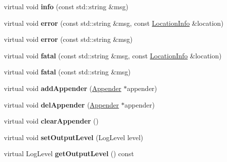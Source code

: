 \begin{DoxyCompactItemize}
\item 
\mbox{\label{classLogger_a681330b09bac2b5dd40a8c8e7f1ce622}} 
virtual void {\bfseries info} (const std\+::string \&msg)
\item 
\mbox{\label{classLogger_aa0a6eb4e205acfc74aaaddd95807fa79}} 
virtual void {\bfseries error} (const std\+::string \&msg, const \hyperlink{classLocationInfo}{Location\+Info} \&location)
\item 
\mbox{\label{classLogger_aa369ce9c9e7452f84027d7644944ecf7}} 
virtual void {\bfseries error} (const std\+::string \&msg)
\item 
\mbox{\label{classLogger_a5ec862064755ee33ff865e47a587959c}} 
virtual void {\bfseries fatal} (const std\+::string \&msg, const \hyperlink{classLocationInfo}{Location\+Info} \&location)
\item 
\mbox{\label{classLogger_a7ad5aa4c133caa1eb1f9083ac99c0dc7}} 
virtual void {\bfseries fatal} (const std\+::string \&msg)
\item 
\mbox{\label{classLogger_a088c8d721517bc477072877adab07b87}} 
virtual void {\bfseries add\+Appender} (\hyperlink{classAppender}{Appender} $\ast$appender)
\item 
\mbox{\label{classLogger_a73285190e257bb20ea4a0d13ecc854a5}} 
virtual void {\bfseries del\+Appender} (\hyperlink{classAppender}{Appender} $\ast$appender)
\item 
\mbox{\label{classLogger_a5810ecdfc84de69fef77860ff67d57a3}} 
virtual void {\bfseries clear\+Appender} ()
\item 
\mbox{\label{classLogger_a93bf50efaa5fbf0aa179fba5c7f47cfd}} 
virtual void {\bfseries set\+Output\+Level} (Log\+Level level)
\item 
\mbox{\label{classLogger_a43a5a5a8d4f6690899b3cef2985ce7a5}} 
virtual Log\+Level {\bfseries get\+Output\+Level} () const
\item 
\mbox{\label{classLogger_af94e809d1bab8e0875ff1dece3a99f36}} 

\end{DoxyCompactItemize}
